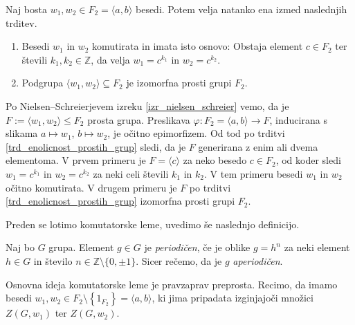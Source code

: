 


\begin{lema}
\label{lem_posledica_nielsen_schreier}
Naj bosta $w_1, w_2 \in F_2 = \langle a, b \rangle$ besedi. Potem velja natanko ena izmed naslednjih trditev. \begin{enumerate}
    \item Besedi $w_1$ in $w_2$ komutirata in imata isto osnovo: Obstaja element $c \in F_2$ ter števili $k_1, k_2 \in \mathbb{Z}$, da velja $w_1= c^{k_1}$ in $w_2 = c^{k_2}$. 
    \item Podgrupa $\langle w_1, w_2 \rangle \subseteq F_2$ je izomorfna prosti grupi $F_2$.
\end{enumerate}
\end{lema}
\begin{dokaz}
    Po Nielsen--Schreierjevem izreku \ref{izr_nielsen_schreier} vemo, da je $F:= \langle w_1 , w_2 \rangle \le F_2$ prosta grupa. Preslikava $\varphi : F_2 = \langle a, b \rangle \to F$,
    inducirana s slikama $a \mapsto w_1$, $b \mapsto w_2$, je očitno epimorfizem. Od tod po trditvi \ref{trd_enolicnost_prostih_grup} sledi, da je $F$ generirana z enim ali dvema elementoma.
    V prvem primeru je $F = \langle c \rangle$ za neko besedo $c \in F_2$, od koder sledi $w_1= c^{k_1}$ in $w_2 = c^{k_2}$ za neki celi števili $k_1$ in $k_2$. V tem primeru besedi $w_1$ in $w_2$ očitno komutirata.
    V drugem primeru je $F$ po trditvi \ref{trd_enolicnost_prostih_grup} izomorfna prosti grupi $F_2$.
\end{dokaz}
Preden se lotimo komutatorske leme, uvedimo še naslednjo definicijo.
\begin{definicija}\label{def_aperiodicna_beseda}
    Naj bo $G$ grupa. Element $g \in  G$ je \emph{periodičen}, če je oblike $g = h^{n}$ za neki element $h \in G$ in število $n \in \mathbb{Z} \setminus \{ 0, \pm 1 \}$. Sicer rečemo, da je $g$ \emph{aperiodičen}.
    \end{definicija}
Osnovna ideja komutatorske leme je pravzaprav preprosta. Recimo, da imamo besedi $w_1, w_2 \in F_2 \setminus \left\{ 1_{F_2}\right\}  = \langle a,b \rangle$, ki jima pripadata izginjajoči množici $Z(G, w_1)$ ter $Z(G, w_2)$.
